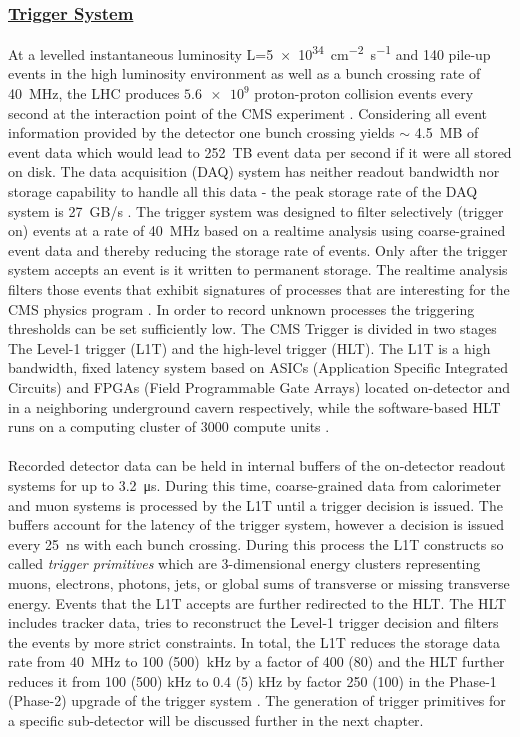 \documentclass[../../main.tex]{subfiles}
\begin{document}
\subsubsection*{\underline{Trigger System}}
At a levelled instantaneous luminosity L=\SI{5e34}{cm^{-2}s^{-1}} and 140 pile-up events in the high luminosity environment as well as a bunch crossing rate of \SI{40}{MHz}, the LHC produces $\num{5.6e9}$ proton-proton collision events every second at the interaction point of the CMS experiment \cite{Collaboration_2008,Bayatian:922757}. Considering all event information provided by the detector one bunch crossing yields $\sim$ \SI{4.5}{MB} of event data which would lead to \SI{252}{TB} event data per second if it were all stored on disk. The data acquisition (DAQ) system has neither readout bandwidth nor storage capability to handle all this data - the peak storage rate of the DAQ system is \SI{27}{GB/s} \cite{andre17}. The trigger system was designed to filter selectively (trigger on) events at a rate of \SI{40}{MHz} based on a realtime analysis using coarse-grained event data and thereby reducing the storage rate of events. Only after the trigger system accepts an event is it written to permanent storage. The realtime analysis filters those events that exhibit signatures of processes that are interesting for the CMS physics program \cite{mr}. In order to record unknown processes the triggering thresholds can be set sufficiently low. The CMS Trigger is divided in two stages The Level-1 trigger (L1T) and the high-level trigger (HLT). The L1T is a high bandwidth, fixed latency system based on ASICs (Application Specific Integrated Circuits) and FPGAs (Field Programmable Gate Arrays) located on-detector and in a neighboring underground cavern respectively, while the software-based HLT runs on a computing cluster of 3000 compute units \cite{tdr_trig}.\\
\\
Recorded detector data can be held in internal buffers of the on-detector readout systems for up to \SI{3.2}{\micro s}. During this time, coarse-grained data from calorimeter and muon systems is processed by the L1T until a trigger decision is issued. The buffers account for the latency of the trigger system, however a decision is issued every \SI{25}{ns} with each bunch crossing. During this process the L1T constructs so called \textit{trigger primitives} which are 3-dimensional energy clusters representing muons, electrons, photons, jets, or global sums of transverse or missing transverse energy. Events that the L1T accepts are further redirected to the HLT. The HLT includes tracker data, tries to reconstruct the Level-1 trigger decision and filters the events by more strict constraints. In total, the L1T reduces the storage data rate from \SI{40}{MHz} to \SI{100 (500)}{kHz} by a factor of 400 (80) and the HLT further reduces it from 100 (500) kHz to 0.4 (5) kHz by factor 250 (100) in the Phase-1 (Phase-2) upgrade of the trigger system \cite{awr,andre17}. The generation of trigger primitives for a specific sub-detector will be discussed further in the next chapter. 
\end{document}
